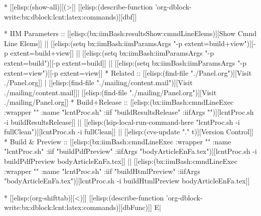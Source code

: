 \begin{whenOrg}
* [[elisp:(show-all)][(>]] [[elisp:(describe-function 'org-dblock-write:bx:dblock:lcnt:latex:commands)][dbf]]
\begin{whenOrg}
*      IIM Parameters    ::  [[elisp:(bx:iimBash:resultsShow:cmndLineElems)][Show Cmnd Line Elems]] || [[elisp:(setq bx:iimBash:iimParamsArgs "-p extent=build+view")][-p extent=build+view]] || [[elisp:(setq bx:iimBash:iimParamsArgs "-p extent=build")][-p extent=build]] || [[elisp:(setq bx:iimBash:iimParamsArgs "-p extent=view")][-p extent=view]]
*      Related           ::  [[elisp:(find-file "./Panel.org")][Visit ./Panel.org]] | [[elisp:(find-file "./mailing/content.mail")][Visit ./mailing/content.mail]]| [[elisp:(find-file "./mailing/Panel.org")][Visit ./mailing/Panel.org]]
*      Build+Release     ::  [[elisp:(bx:iimBash:cmndLineExec :wrapper "" :name "lcntProc.sh" :iif "buildResultsRelease" :iifArgs "")][lcntProc.sh -i buildResultsRelease]] || [[elisp:(lsip-local-run-command-here "lcntProc.sh -i fullClean")][lcntProc.sh -i fullClean]] || [[elisp:(cvs-update "." t)][Version Control]]
*      Build & Preview   ::  [[elisp:(bx:iimBash:cmndLineExec :wrapper "" :name "lcntProc.sh" :iif "buildPdfPreview" :iifArgs "bodyArticleEnFa.tex")][lcntProc.sh -i buildPdfPreview bodyArticleEnFa.tex]] || [[elisp:(bx:iimBash:cmndLineExec :wrapper "" :name "lcntProc.sh" :iif "buildHtmlPreview" :iifArgs "bodyArticleEnFa.tex")][lcntProc.sh -i buildHtmlPreview bodyArticleEnFa.tex]]

* [[elisp:(org-shifttab)][<)]] [[elisp:(describe-function 'org-dblock-write:bx:dblock:lcnt:latex:commands)][dbFunc)]]  E|

\end{whenOrg}

\end{whenOrg}
